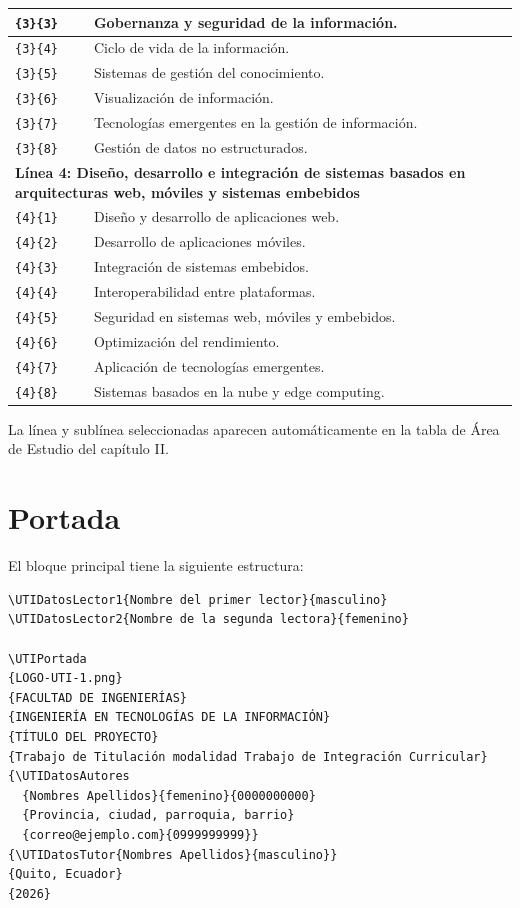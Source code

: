 \documentclass[12pt,a4paper,oneside]{report}
\begin{document}
\begin{longtable}{|p{2cm}|p{10.6cm}|}
  \hline
  \texttt{\{3\}\{3\}} & Gobernanza y seguridad de la información. \\
  \hline
  \texttt{\{3\}\{4\}} & Ciclo de vida de la información. \\
  \hline
  \texttt{\{3\}\{5\}} & Sistemas de gestión del conocimiento. \\
  \hline
  \texttt{\{3\}\{6\}} & Visualización de información. \\
  \hline
  \texttt{\{3\}\{7\}} & Tecnologías emergentes en la gestión de información. \\
  \hline
  \texttt{\{3\}\{8\}} & Gestión de datos no estructurados. \\
  \hline
  \multicolumn{2}{|p{12.6cm}|}{\textbf{Línea 4: Diseño, desarrollo e integración de sistemas basados en arquitecturas web, móviles y sistemas embebidos}} \\
  \hline
  \texttt{\{4\}\{1\}} & Diseño y desarrollo de aplicaciones web. \\
  \hline
  \texttt{\{4\}\{2\}} & Desarrollo de aplicaciones móviles. \\
  \hline
  \texttt{\{4\}\{3\}} & Integración de sistemas embebidos. \\
  \hline
  \texttt{\{4\}\{4\}} & Interoperabilidad entre plataformas. \\
  \hline
  \texttt{\{4\}\{5\}} & Seguridad en sistemas web, móviles y embebidos. \\
  \hline
  \texttt{\{4\}\{6\}} & Optimización del rendimiento. \\
  \hline
  \texttt{\{4\}\{7\}} & Aplicación de tecnologías emergentes. \\
  \hline
  \texttt{\{4\}\{8\}} & Sistemas basados en la nube y edge computing. \\
  \hline
\end{longtable}

La línea y sublínea seleccionadas aparecen automáticamente en la tabla de Área de Estudio del capítulo II.

\section{Portada}

El bloque principal tiene la siguiente estructura:

\begin{lstlisting}
\UTIDatosLector1{Nombre del primer lector}{masculino}
\UTIDatosLector2{Nombre de la segunda lectora}{femenino}

\UTIPortada
{LOGO-UTI-1.png}
{FACULTAD DE INGENIERÍAS}
{INGENIERÍA EN TECNOLOGÍAS DE LA INFORMACIÓN}
{TÍTULO DEL PROYECTO}
{Trabajo de Titulación modalidad Trabajo de Integración Curricular}
{\UTIDatosAutores
  {Nombres Apellidos}{femenino}{0000000000}
  {Provincia, ciudad, parroquia, barrio}
  {correo@ejemplo.com}{0999999999}}
{\UTIDatosTutor{Nombres Apellidos}{masculino}}
{Quito, Ecuador}
{2026}
\end{lstlisting}
\end{document}
